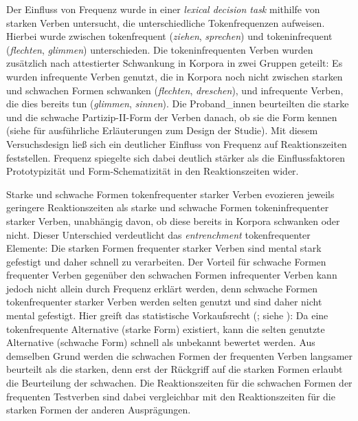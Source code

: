 Der Einfluss von Frequenz wurde in einer \textit{lexical decision task} mithilfe von starken Verben untersucht, die unterschiedliche Tokenfrequenzen aufweisen. Hierbei wurde zwischen tokenfrequent (\textit{ziehen}, \textit{sprechen})  und tokeninfrequent  (\textit{flechten}, \textit{glimmen}) unterschieden. Die tokeninfrequenten Verben wurden zusätzlich nach attestierter Schwankung in Korpora in zwei Gruppen geteilt: Es wurden infrequente Verben genutzt, die in Korpora noch nicht zwischen starken und schwachen Formen schwanken (\textit{flechten}, \textit{dreschen}), und infrequente Verben, die dies bereits tun (\textit{glimmen}, \textit{sinnen}). Die Proband\_innen beurteilten die starke und die schwache Partizip-II-Form der Verben danach, ob sie die Form kennen (siehe  für ausführliche Erläuterungen zum Design der Studie). Mit diesem Versuchsdesign ließ sich ein deutlicher Einfluss von Frequenz auf Reaktionszeiten feststellen. Frequenz spiegelte sich dabei deutlich stärker als die Einflussfaktoren Prototypizität und Form-Schematizität in den Reaktionszeiten wider. 

\begin{sloppypar}
Starke und schwache Formen tokenfrequenter starker Verben evozieren jeweils geringere Reaktionszeiten als starke und schwache Formen tokeninfrequenter starker Verben, unabhängig davon, ob diese bereits in Korpora schwanken oder nicht. Dieser Unterschied verdeutlicht das \textit{entrenchment} tokenfrequenter Elemente: Die starken Formen frequenter starker Verben sind mental stark gefestigt und daher schnell zu verarbeiten. Der Vorteil für schwache Formen frequenter Verben gegenüber den schwachen Formen infrequenter Verben kann jedoch nicht allein durch Frequenz erklärt werden, denn schwache Formen tokenfrequenter starker Verben werden selten genutzt und sind daher nicht mental gefestigt. Hier greift das statistische Vorkaufsrecht (\cite[74--94]{Goldberg.2019}; siehe ): Da eine tokenfrequente Alternative (starke Form) existiert, kann die selten genutzte Alternative (schwache Form) schnell als unbekannt bewertet werden. Aus demselben Grund werden die schwachen Formen der frequenten Verben langsamer beurteilt als die starken, denn erst der Rückgriff auf die starken Formen erlaubt die Beurteilung der schwachen. Die Reaktionszeiten für die schwachen Formen der frequenten Testverben sind dabei vergleichbar mit den Reaktionszeiten für die starken Formen der anderen Ausprägungen. 
\end{sloppypar}
 
